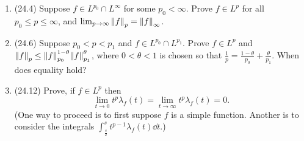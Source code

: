 \documentclass[11pt]{article}
\begin{document}
\begin{enumerate}
    \item (24.4) Suppose $f\in L^{p_0}\cap L^\infty$ for some $p_0<\infty$. Prove $f\in L^p$ for all $p_0\leq p\leq \infty$, and $\lim_{p\to\infty}\norm{f}_p = \norm{f}_\infty$.
    \item (24.6) Suppose $p_0<p<p_1$ and $f\in L^{p_0}\cap L^{p_1}$. Prove $f\in L^p$ and $\norm{f}_p\leq \norm{f}_{p_0}^{1-\theta}\norm{f}_{p_1}^\theta$, where $0<\theta<1$ is chosen so that $\frac{1}{p} = \frac{1-\theta}{p_0}+\frac{\theta}{p_1}$. When does equality hold?
    \item (24.12) Prove, if $f\in L^p$ then \[\lim_{t\to 0}t^p\lambda_f(t) = \lim_{t\to\infty}t^p\lambda_f(t) = 0.\] (One way to proceed is to first suppose $f$ is a simple function. Another is to consider the integrals $\int_{\frac{s}{2}}^s t^{p-1}\lambda_f(t)\dd{t}$.)
\end{enumerate}
\end{document}
